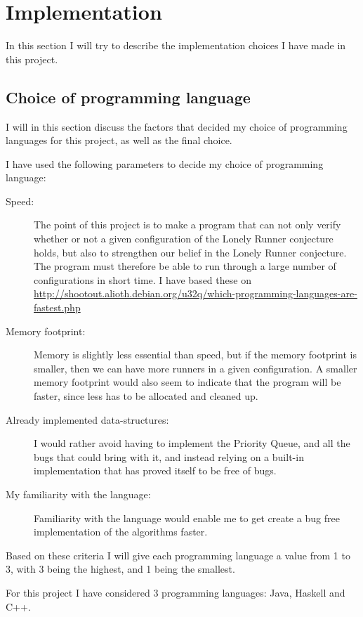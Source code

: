 \section{Implementation}
\label{implementation}

In this section I will try to describe the implementation choices I have made in this project.


\subsection{Choice of programming language}
I will in this section discuss the factors that decided my choice of programming languages for this project, as well as the final choice.

I have used the following parameters to decide my choice of programming language:
\begin{description}
\item[Speed:] The point of this project is to make a program that can not only verify whether or not a given configuration of the Lonely Runner conjecture holds, but also to strengthen our belief in the Lonely Runner conjecture. The program must therefore be able to run through a large number of configurations in short time. I have based these on \url{http://shootout.alioth.debian.org/u32q/which-programming-languages-are-fastest.php}
\item[Memory footprint:] Memory is slightly less essential than speed, but if the memory footprint is smaller, then we can have more runners in a given configuration. A smaller memory footprint would also seem to indicate that the program will be faster, since less has to be allocated and cleaned up. 
\item[Already implemented data-structures:] I would rather avoid having to implement the Priority Queue, and all the bugs that could bring with it, and instead relying on a built-in implementation that has proved itself to be free of bugs.
\item[My familiarity with the language:] Familiarity with the language would enable me to get create a bug free implementation of the algorithms faster.
\end{description}

Based on these criteria I will give each programming language a value from 1 to 3, with 3 being the highest, and 1 being the smallest. 

For this project I have considered 3 programming languages: Java, Haskell and C++.

